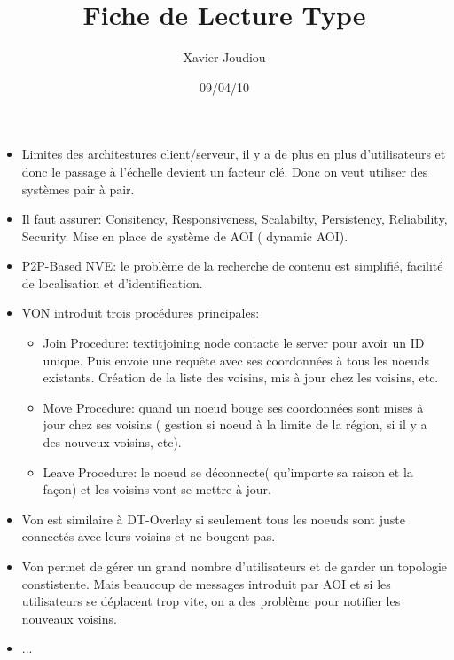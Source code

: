 \documentclass[11pt,a4paper]{article}
\title{Fiche de Lecture Type}
\author{Xavier Joudiou}
\date{09/04/10}
\begin{document}
	
  \begin{itemize}
  \renewcommand{\labelitemi}{$\Rightarrow$}
	\item Limites des architestures client/serveur, il y a de plus en plus d'utilisateurs et donc le passage à l'échelle devient un facteur clé. Donc on veut utiliser des systèmes pair à pair. 
	\item Il faut assurer: Consitency, Responsiveness, Scalabilty, Persistency, Reliability, Security. Mise en place de système de AOI ( dynamic AOI).
	\item P2P-Based NVE: le problème de la recherche de contenu est simplifié, facilité de localisation et d'identification. 
	\item VON introduit trois procédures principales:
	\begin{itemize}
		\item Join Procedure: textit{joining node} contacte le server pour avoir un ID unique. Puis envoie une requête avec ses coordonnées à tous les noeuds existants. Création de la liste des voisins, mis à jour chez les voisins, etc.
		\item Move Procedure: quand un noeud bouge ses coordonnées sont mises à jour chez ses voisins ( gestion si noeud à la limite de la région, si il y a des nouveux voisins, etc).
		\item Leave Procedure: le noeud se déconnecte( qu'importe sa raison et la façon) et les voisins vont se mettre à jour. 
	\end{itemize}
	\item Von est similaire à DT-Overlay si seulement tous les noeuds sont juste connectés avec leurs voisins et ne bougent pas.
	\item Von permet de gérer un grand nombre d'utilisateurs et de garder un topologie constistente. Mais beaucoup de messages introduit par AOI et si les utilisateurs se déplacent trop vite, on  a des problème pour notifier les nouveaux voisins.
	\item ...
  \end{itemize}
\end{document}
